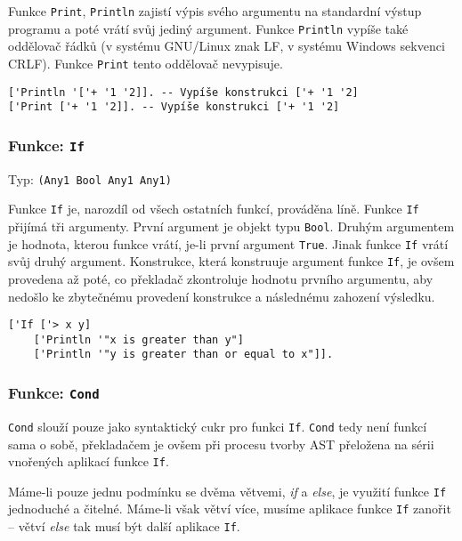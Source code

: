 Funkce \lstinline{Print}, \lstinline{Println} zajistí výpis svého argumentu na standardní výstup
programu a poté vrátí svůj jediný argument. Funkce \lstinline{Println} vypíše také oddělovač řádků
(v systému GNU/Linux znak LF, v systému Windows sekvenci CRLF). Funkce \lstinline{Print} tento
oddělovač nevypisuje.

\begin{lstlisting}[caption={Ukázka využití Print, Println}]
['Println '['+ '1 '2]]. -- Vypíše konstrukci ['+ '1 '2]
['Print ['+ '1 '2]]. -- Vypíše konstrukci ['+ '1 '2]
\end{lstlisting}

\subsubsection*{Funkce: \lstinline{If}}
Typ: \lstinline{(Any1 Bool Any1 Any1)}

Funkce \lstinline{If} je, narozdíl od všech ostatních funkcí, prováděna líně. Funkce \lstinline{If}
přijímá tři argumenty. První argument je objekt typu \lstinline{Bool}. Druhým argumentem je hodnota,
kterou funkce vrátí, je-li první argument \lstinline{True}. Jinak funkce \lstinline{If} vrátí svůj
druhý argument. Konstrukce, která konstruuje argument funkce \lstinline{If}, je ovšem provedena až
poté, co překladač zkontroluje hodnotu prvního argumentu, aby nedošlo ke zbytečnému provedení
konstrukce a následnému zahození výsledku.

\begin{lstlisting}[caption={Ukázka využití If}]
['If ['> x y]
    ['Println '"x is greater than y"]
    ['Println '"y is greater than or equal to x"]].
\end{lstlisting}

\subsubsection*{Funkce: \lstinline{Cond}}

\lstinline{Cond} slouží pouze jako syntaktický cukr pro funkci \lstinline{If}. \lstinline{Cond} tedy
není funkcí sama o sobě, překladačem je ovšem při procesu tvorby AST přeložena na sérii vnořených
aplikací funkce \lstinline{If}.

Máme-li pouze jednu podmínku se dvěma větvemi, \textit{if} a \textit{else}, je využití funkce
\lstinline{If} jednoduché a čitelné. Máme-li však větví více, musíme aplikace funkce \lstinline{If}
zanořit -- větví \textit{else} tak musí být další aplikace \lstinline{If}.

